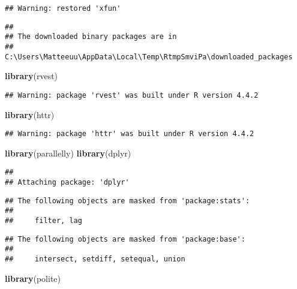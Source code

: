 \documentclass[
]{article}
\newenvironment{Shaded}{\begin{snugshade}}{\end{snugshade}}
\newcommand{\FunctionTok}[1]{\textcolor[rgb]{0.13,0.29,0.53}{\textbf{#1}}}
\newcommand{\NormalTok}[1]{#1}
\begin{document}
\begin{verbatim}
## Warning: restored 'xfun'
\end{verbatim}

\begin{verbatim}
## 
## The downloaded binary packages are in
##  C:\Users\Matteeuu\AppData\Local\Temp\RtmpSmviPa\downloaded_packages
\end{verbatim}

\begin{Shaded}
\begin{Highlighting}[]
\FunctionTok{library}\NormalTok{(rvest)}
\end{Highlighting}
\end{Shaded}

\begin{verbatim}
## Warning: package 'rvest' was built under R version 4.4.2
\end{verbatim}

\begin{Shaded}
\begin{Highlighting}[]
\FunctionTok{library}\NormalTok{(httr)}
\end{Highlighting}
\end{Shaded}

\begin{verbatim}
## Warning: package 'httr' was built under R version 4.4.2
\end{verbatim}

\begin{Shaded}
\begin{Highlighting}[]
\FunctionTok{library}\NormalTok{(parallelly)}
\FunctionTok{library}\NormalTok{(dplyr)}
\end{Highlighting}
\end{Shaded}

\begin{verbatim}
## 
## Attaching package: 'dplyr'
\end{verbatim}

\begin{verbatim}
## The following objects are masked from 'package:stats':
## 
##     filter, lag
\end{verbatim}

\begin{verbatim}
## The following objects are masked from 'package:base':
## 
##     intersect, setdiff, setequal, union
\end{verbatim}

\begin{Shaded}
\begin{Highlighting}[]
\FunctionTok{library}\NormalTok{(polite)}
\end{Highlighting}
\end{Shaded}
\end{document}
